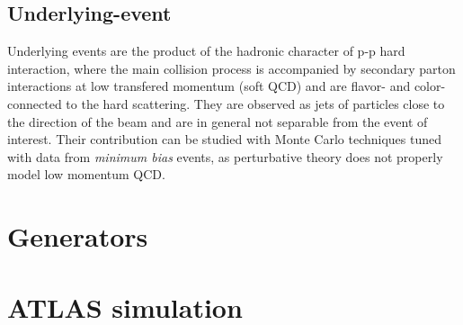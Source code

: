 \subsection{Underlying-event}\label{sec:underlyingevent}

Underlying events are the product of the hadronic character of p-p hard interaction, where the main collision process
is accompanied by secondary parton interactions at low transfered momentum (soft QCD) and are flavor- and color-connected to the
hard scattering. They are observed as jets of particles close to the direction of the beam and are in general not 
separable from the event of interest. Their contribution can be studied with Monte Carlo techniques tuned with data from 
\textit{minimum bias} events, as perturbative theory does not properly model low momentum QCD.


\section{Generators}\label{sec:generators}

\section{ATLAS simulation}\label{sec:MCdetector}
